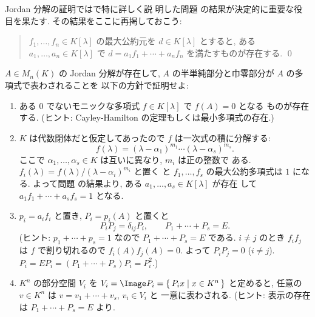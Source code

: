 \documentclass[12pt,twoside]{jarticle}
\begin{document}
\medskip

Jordan 分解の証明ではで特に詳しく説
明した問題  の結果が決定的に重要な役目を果たす.
その結果をここに再掲しておこう:
\begin{quote}
  $f_1,\dots,f_n\in K[\lambda]$ の最大公約元を $d\in K[\lambda]$ とすると,
  ある $a_1,\dots,a_n\in K[\lambda]$ 
  で $d=a_1f_1+\cdots+a_nf_n$ を満たすものが存在する. \qed
\end{quote}


\begin{question}
\label{q:Jordan-decomp-1}
  $A\in M_n(K)$ の Jordan 分解が存在して,
  $A$ の半単純部分と巾零部分が $A$ の多項式で表わされることを
  以下の方針で証明せよ:
  \begin{enumerate}
  \item ある $0$ でないモニックな多項式 $f\in K[\lambda]$ で $f(A)=0$ となる
    ものが存在する.  (ヒント: Cayley-Hamilton の定理もしくは最小多項式の存在.)
  \item $K$ は代数閉体だと仮定してあったので $f$ は一次式の積に分解する:
    \begin{equation*}
      f(\lambda) = (\lambda-\alpha_1)^{m_1}\cdots(\lambda-\alpha_s)^{m_s}.
    \end{equation*}
    ここで $\alpha_1,\dots,\alpha_s\in K$ は互いに異なり, $m_i$ は正の整数で
    ある.  $f_i(\lambda)=f(\lambda)/(\lambda-\alpha_i)^{m_i}$ と置く
    と $f_1,\dots,f_s$ の最大公約多項式は $1$ になる.
    よって問題  の結果より, 
    ある $a_1,\dots,a_s\in K[\lambda]$ が存在
    して $a_1 f_1 + \cdots + a_s f_s = 1$ となる.
  \item $p_i = a_i f_i$ と置き, $P_i = p_i(A)$ と置くと
    \begin{equation*}
      P_i P_j = \delta_{ij} P_i, 
      \qquad
      P_1 + \cdots + P_s = E.
    \end{equation*}
    (ヒント: $p_1+\cdots+p_s=1$ なので $P_1+\cdots+P_s=E$ である.
    $i\ne j$ のとき $f_if_j$ は $f$ で割り切れるので $f_i(A)f_j(A)=0$.
    よって $P_iP_j=0$ ($i\ne j$).  $P_i=EP_i=(P_1+\cdots+P_s)P_i=P_i^2$.)
  \item $K^n$ の部分空間 $V_i$ 
    を $V_i=\Image P_i = \{\, P_i x \mid x \in K^n \,\}$ と定めると,
    任意の $v\in K^n$ は $v = v_1 + \cdots + v_s$, $v_i\in V_i$ と
    一意に表わされる. 
    (ヒント: 表示の存在は $P_1 + \cdots + P_s = E$ より.

\end{enumerate}
\end{question}
\end{document}
